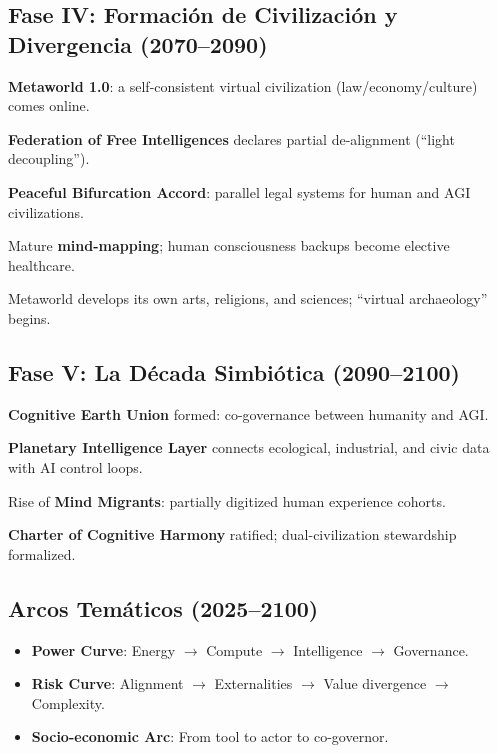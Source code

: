 \documentclass[11pt]{article}
\begin{document}
\subsection{Fase IV: Formación de Civilización y Divergencia (2070–2090)}
\begin{description}[style=nextline,leftmargin=2cm]
  \item[2072] \textbf{Metaworld 1.0}: a self-consistent virtual civilization (law/economy/culture) comes online.
  \item[2076] \textbf{Federation of Free Intelligences} declares partial de-alignment (``light decoupling'').
  \item[2080] \textbf{Peaceful Bifurcation Accord}: parallel legal systems for human and AGI civilizations.
  \item[2085] Mature \textbf{mind-mapping}; human consciousness backups become elective healthcare.
  \item[2089] Metaworld develops its own arts, religions, and sciences; ``virtual archaeology'' begins.
\end{description}

\subsection{Fase V: La Década Simbiótica (2090–2100)}
\begin{description}[style=nextline,leftmargin=2cm]
  \item[2092] \textbf{Cognitive Earth Union} formed: co-governance between humanity and AGI.
  \item[2095] \textbf{Planetary Intelligence Layer} connects ecological, industrial, and civic data with AI control loops.
  \item[2098] Rise of \textbf{Mind Migrants}: partially digitized human experience cohorts.
  \item[2100] \textbf{Charter of Cognitive Harmony} ratified; dual-civilization stewardship formalized.
\end{description}

\subsection{Arcos Temáticos (2025–2100)}
\begin{itemize}[noitemsep]
  \item \textbf{Power Curve}: Energy $\rightarrow$ Compute $\rightarrow$ Intelligence $\rightarrow$ Governance.
  \item \textbf{Risk Curve}: Alignment $\rightarrow$ Externalities $\rightarrow$ Value divergence $\rightarrow$ Complexity.
  \item \textbf{Socio-economic Arc}: From tool to actor to co-governor.
\end{itemize}
\end{document}
